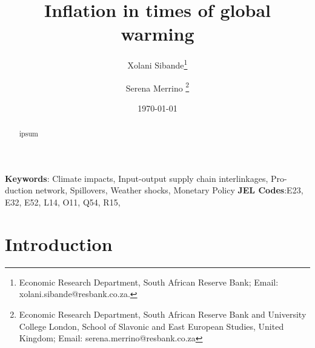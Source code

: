 \documentclass[
  letterpaper,
  DIV=11,
  numbers=noendperiod]{scrartcl}
\author{}
\date{}
\begin{document}
\title{Inflation in times of global warming}


\author {Xolani Sibande\footnote{Economic Research Department, South African Reserve Bank; Email: xolani.sibande@resbank.co.za.} \and
Serena Merrino \footnote{Economic Research Department, South African Reserve Bank and University College London, School of Slavonic and East European Studies, United Kingdom; Email: serena.merrino@resbank.co.za}}


\date{\today}
\maketitle

\begin{abstract}
ipsum

\end{abstract}

\noindent\textbf{Keywords}: Climate impacts, Input-output supply chain interlinkages, Pro-
duction network, Spillovers, Weather shocks, Monetary Policy
\textbf{JEL Codes}:E23, E32, E52, L14, O11, Q54, R15,
\newpage


\section{Introduction}\label{introduction}
\end{document}
